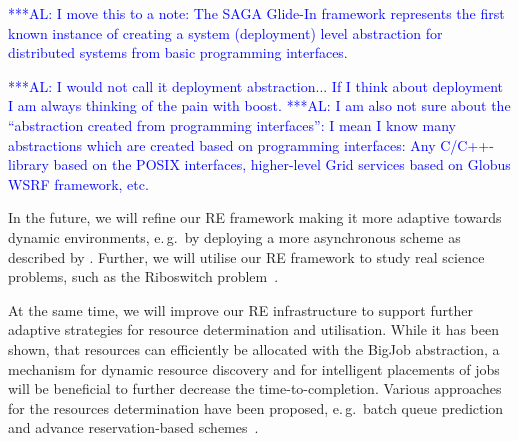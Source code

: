\documentclass{rspublic}
\newcommand{\alnote}[1]{ {\textcolor{blue} { ***AL: #1 }}}
\newcommand{\alnote}[1]{}
\newcommand{\glidein}[1]{Glide-In }
\begin{document}
\alnote{I move this to a note:
The SAGA \glidein\ framework represents the first known instance of creating a
system (deployment) level abstraction for distributed systems from
basic programming interfaces.} 

\alnote{I would not call it deployment abstraction... If I think about
deployment I am always thinking of the pain with boost.}
\alnote{I am also not sure about the ``abstraction created from 
  programming interfaces'': 
  I mean I know many abstractions which are created based on
  programming interfaces: Any C/C++-library based on the POSIX
  interfaces, higher-level Grid services based on Globus WSRF
  framework, etc.}   


       

                                 


   
        
In the future, we will refine our RE framework making it
more adaptive towards dynamic environments, e.\,g.\ by deploying  
a more asynchronous scheme as described by \citet{Gallicchio:2007yq}.
Further, we will utilise our RE framework to study real science problems,
such as the Riboswitch problem~\citep{Huang:2008xe}.     


At the same time, we will  improve our RE infrastructure to support
further adaptive strategies for resource determination and utilisation.
While it has been shown, that resources can efficiently be allocated with
the BigJob abstraction, a mechanism for dynamic resource discovery and 
for intelligent placements of jobs will be beneficial to further 
decrease the time-to-completion. 
Various approaches for the resources determination have been proposed, e.\,g.\ batch queue 
prediction~\citep{1254939,Chakraborty:2008nx} and advance reservation-based 
schemes~\citep{Jeske:2007wj}. 
\end{document}
